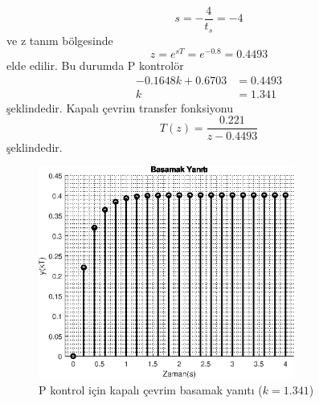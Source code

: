 \begin{equation}
    s=-\frac{4}{t_s}=-4
\end{equation}
ve z tanım bölgesinde
\begin{equation}
    z=e^{sT}=e^{-0.8}=0.4493
\end{equation}
elde edilir. Bu durumda P kontrolör
\begin{equation}
\begin{split}
    -0.1648k+0.6703&=0.4493\\
    k&=1.341
\end{split}
\end{equation}
şeklindedir. Kapalı çevrim transfer fonksiyonu
\begin{equation}
    T(z)=\frac{0.221}{z - 0.4493}
\end{equation}
şeklindedir.
\begin{figure}[!htb]
    \centering
    \includegraphics[width=0.75\textwidth]{img/lec7_step1}
    \caption{P kontrol için kapalı çevrim basamak yanıtı ($k=1.341$)}
    \label{fig:lec7_step1}
\end{figure}

